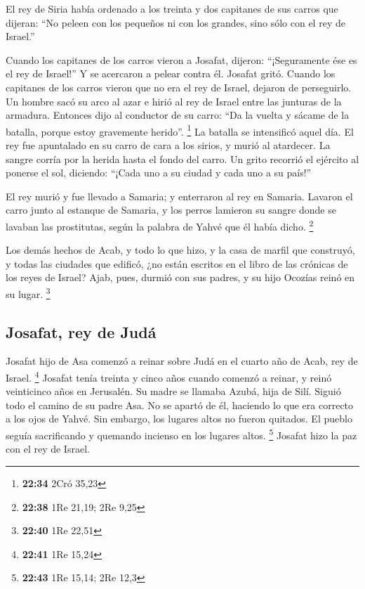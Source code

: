 \begin{paracol}{2}
 El rey de Siria había ordenado a los treinta y dos
capitanes de sus carros que dijeran: ``No peleen con los pequeños ni con
los grandes, sino sólo con el rey de Israel.''

 Cuando los capitanes de los carros vieron a Josafat,
dijeron: ``¡Seguramente ése es el rey de Israel!'' Y se acercaron a
pelear contra él. Josafat gritó.  Cuando los capitanes de
los carros vieron que no era el rey de Israel, dejaron de perseguirlo.
 Un hombre sacó su arco al azar e hirió al rey de Israel
entre las junturas de la armadura. Entonces dijo al conductor de su
carro: ``Da la vuelta y sácame de la batalla, porque estoy gravemente
herido''. \footnote{\textbf{22:34} 2Cró 35,23}  La
batalla se intensificó aquel día. El rey fue apuntalado en su carro de
cara a los sirios, y murió al atardecer. La sangre corría por la herida
hasta el fondo del carro.  Un grito recorrió el ejército
al ponerse el sol, diciendo: ``¡Cada uno a su ciudad y cada uno a su
país!''

 El rey murió y fue llevado a Samaria; y enterraron al
rey en Samaria.  Lavaron el carro junto al estanque de
Samaria, y los perros lamieron su sangre donde se lavaban las
prostitutas, según la palabra de Yahvé que él había dicho. \footnote{\textbf{22:38}
  1Re 21,19; 2Re 9,25}

 Los demás hechos de Acab, y todo lo que hizo, y la casa
de marfil que construyó, y todas las ciudades que edificó, ¿no están
escritos en el libro de las crónicas de los reyes de Israel?
 Ajab, pues, durmió con sus padres, y su hijo Ocozías
reinó en su lugar. \footnote{\textbf{22:40} 1Re 22,51}

\hypertarget{josafat-rey-de-juduxe1}{%
\subsection{Josafat, rey de Judá}\label{josafat-rey-de-juduxe1}}

 Josafat hijo de Asa comenzó a reinar sobre Judá en el
cuarto año de Acab, rey de Israel. \footnote{\textbf{22:41} 1Re 15,24}
 Josafat tenía treinta y cinco años cuando comenzó a
reinar, y reinó veinticinco años en Jerusalén. Su madre se llamaba
Azubá, hija de Silí.  Siguió todo el camino de su padre
Asa. No se apartó de él, haciendo lo que era correcto a los ojos de
Yahvé. Sin embargo, los lugares altos no fueron quitados. El pueblo
seguía sacrificando y quemando incienso en los lugares altos.
\footnote{\textbf{22:43} 1Re 15,14; 2Re 12,3}  Josafat
hizo la paz con el rey de Israel.


\end{paracol}
